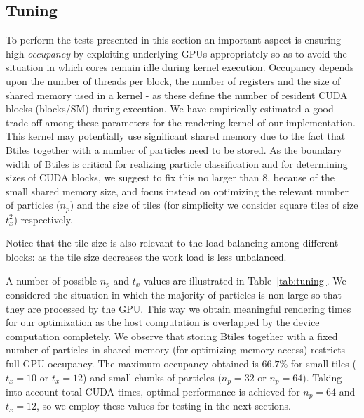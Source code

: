 \documentclass[1p]{elsarticle}
\begin{document}
\subsection{Tuning}
\label{sec:gpuperf}
To perform the tests presented in this section an important aspect is ensuring high {\it occupancy} by exploiting underlying GPUs appropriately so as to avoid the situation in which cores remain idle during kernel execution. Occupancy depends upon the number of threads per block, the number of registers and the size of shared memory used in a kernel - as these define the number of resident CUDA blocks (blocks/SM) during execution. We have empirically estimated a good trade-off among these parameters for the rendering kernel of our implementation. This kernel may potentially use significant shared memory due to the fact that Btiles together with a number of particles need to be stored. As the boundary width of Btiles is critical for realizing particle classification and for determining sizes of CUDA blocks, we suggest to fix this no larger than 8, because of the small shared memory size, and focus instead on optimizing the relevant number of particles ($n_p$) and the size of tiles (for simplicity we consider square tiles of size $t_x^2$) respectively.
 
Notice that the tile size is also relevant to the load balancing among different blocks: as the tile size decreases the work load is less unbalanced. 

A number of possible $n_p$ and $t_x$ values are illustrated in Table~\ref{tab:tuning}. We considered the situation in which the majority of particles is non-large so that they are processed by the GPU. This way we obtain meaningful rendering times for our optimization as the host computation is overlapped by the device computation completely. We observe that storing Btiles together with a fixed number of particles in shared memory (for optimizing memory access) restricts full GPU occupancy. The maximum occupancy obtained is $66.7\%$ for small tiles ($t_x = 10$ or $t_x = 12$) and small chunks of particles ($n_p = 32$ or $n_p=64$). Taking into account total CUDA times, optimal performance is achieved for $n_p=64$ and $t_x = 12$, so we employ these values for testing in the next sections.
\end{document}
